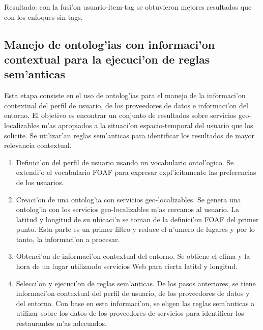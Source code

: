 \documentclass[11pt]{article}
\begin{document}
Resultado: con la fusi'on usuario-item-tag se obtuvieron mejores resultados que con los enfoques sin tags. 

\subsection{Manejo de ontolog'ias con informaci'on contextual para la ejecuci'on de reglas sem'anticas}

Esta etapa consiste en el uso de ontolog'ias para el manejo de la informaci'on contextual del perfil de usuario, de los proveedores de datos e informaci'on del entorno. El objetivo es encontrar un conjunto de resultados sobre servicios geo-localizables m'as apropiados a la situaci'on espacio-temporal del usuario que los solicite. Se utilizar'an reglas sem'anticas para identificar los resultados de mayor relevancia contextual.

\begin{enumerate}
\item Definici'on del perfil de usuario usando un vocabulario ontol'ogico. Se extendi'o el vocabulario FOAF para expresar expl'icitamente las preferencias de los usuarios.
\item Creaci'on de una ontolog'ia con servicios geo-localizables. Se genera una ontolog'ia con los servicios geo-localizables m'as cercanos al usuario. La latitud y longitud de su ubicaci'n se toman de la definici'on FOAF del primer punto. Esta parte es un primer filtro y reduce el n'umero de lugares y por lo tanto, la informaci'on a procesar.
\item Obtenci'on de informaci'on contextual del entorno. Se obtiene el clima y la hora de un lugar utilizando servicios Web para cierta latitd y longitud.
\item Selecci'on y ejecuci'on de reglas sem'anticas. De los pasos anteriores, se tiene informaci'on contextual del perfil de usuario, de los proveedores de datos y del entorno. Con base en esta informaci'on, se eligen las reglas sem'anticas a utilizar sobre los datos de los proveedores de servicios para identificar los restaurantes m'as adecuados.
\end{enumerate}
\end{document}
